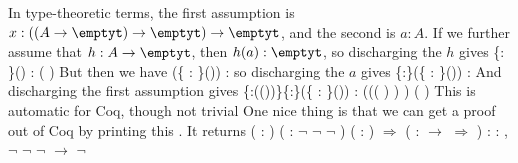 In type-theoretic terms, the first assumption is $x : ((A \to \emptyt) \to
\emptyt) \to \emptyt$, and the second is $a : A$.  If we further assume that
$h : A \to \emptyt$, then $h(a) : \emptyt$, so discharging the $h$ gives
  \{:  \}() : (  )  
But then we have
  (\{ :   \}()) : 
so discharging the $a$ gives
  \{:\}(\{ :   \}()) :   
And discharging the first assumption gives
  \{:(())\}\{:\}(\{ :  
    \}()) :
  (((  )  )  )  (  )
This is automatic for Coq, though not trivial
One nice thing is that we can get a proof out of Coq by printing this
.  It returns
\coqdoceol
\coqdocemptyline
\coqdocnoindent
{} ( : ) ( : \ensuremath{\lnot} \ensuremath{\lnot} \ensuremath{\lnot} ) ( : ) \ensuremath{\Rightarrow}  (  :  \ensuremath{\rightarrow}  \ensuremath{\Rightarrow}  ) \coqdoceol
\coqdocindent{2.00em}
: \coqdockw{\ensuremath{\forall}}  : , \ensuremath{\lnot} \ensuremath{\lnot} \ensuremath{\lnot}  \ensuremath{\rightarrow} \ensuremath{\lnot} 

